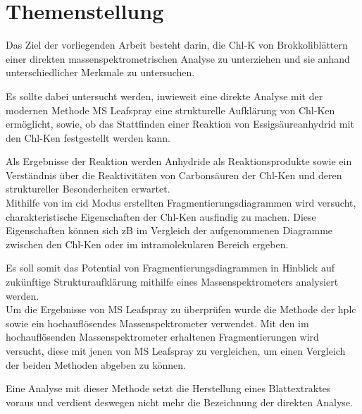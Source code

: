 \chapter{Themenstellung} \label{sec:Themenstellung}

Das Ziel der vorliegenden Arbeit besteht darin, die \gls{Chl-K} von Brokkoliblättern einer direkten massenspektrometrischen Analyse zu unterziehen und sie anhand unterschiedlicher Merkmale zu untersuchen.

Es sollte dabei untersucht werden, inwieweit eine direkte Analyse mit der modernen Methode MS Leafspray eine strukturelle Aufklärung von \gls{Chl-K}en ermöglicht, sowie, ob das Stattfinden einer Reaktion von Essigsäureanhydrid mit den \gls{Chl-K}en festgestellt werden kann. 

Als Ergebnisse der Reaktion werden Anhydride als Reaktionsprodukte sowie ein Verständnis über die Reaktivitäten von Carbonsäuren der \gls{Chl-K}en und deren struktureller Besonderheiten erwartet.\\

Mithilfe von im \gls{cid} Modus erstellten Fragmentierungsdiagrammen wird versucht, charakteristische Eigenschaften der \gls{Chl-K}en ausfindig zu machen. Diese Eigenschaften können sich \gls{zB} im Vergleich der aufgenommenen Diagramme zwischen den \gls{Chl-K}en oder im intramolekularen Bereich ergeben. 

Es soll somit das Potential von Fragmentierungsdiagrammen in Hinblick auf zukünftige Strukturaufklärung mithilfe eines Massenspektrometers analysiert werden. \\

Um die Ergebnisse von MS Leafspray zu überprüfen wurde die Methode der \gls{hplc} sowie ein hochauflösendes Massenspektrometer verwendet. Mit den im hochauflösenden Massenspektrometer erhaltenen Fragmentierungen wird versucht, diese mit jenen von MS Leafspray zu vergleichen, um einen Vergleich der beiden Methoden abgeben zu können.

Eine Analyse mit dieser Methode setzt die Herstellung eines Blattextraktes voraus und verdient deswegen nicht mehr die Bezeichnung der direkten Analyse.




